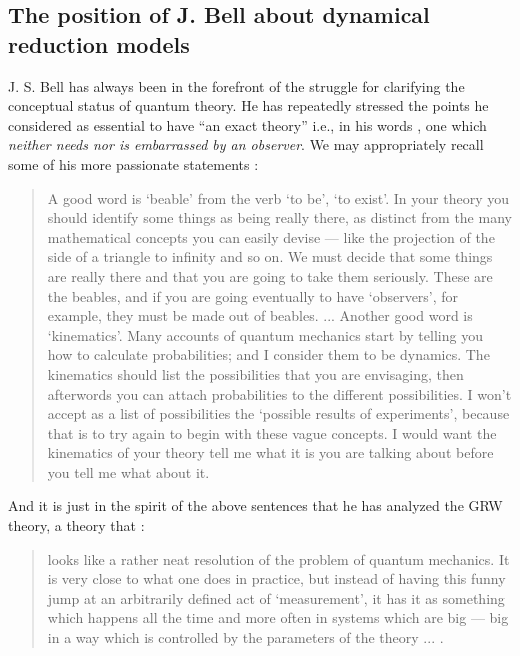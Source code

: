 \documentclass[10pt,a4paper]{article}
\begin{document}
\subsection{The position of J. Bell about dynamical reduction
models} \label{sec121}

J. S. Bell has always been in the forefront of the struggle for
clarifying the conceptual status of quantum theory. He has
repeatedly stressed the points he considered as essential to have
``an exact theory'' i.e., in his words \cite{bellqg}, one which
{\it neither needs nor is embarrassed by an observer}. We may
appropriately recall some of his more passionate statements \cite{bell89}:
\begin{quotation}
A good word is `beable' from the verb `to be', `to exist'. In your
theory you should identify some things as being really there, as
distinct from the many mathematical concepts you can easily devise
--- like the projection of the side of a triangle to infinity and
so on. We must decide that some things are really there and that
you are going to take them seriously. These are the beables, and
if you are going eventually to have `observers', for example, they
must be made out of beables. ... Another good word is
`kinematics'. Many accounts of quantum mechanics start by telling
you how to calculate probabilities; and I consider them to be
dynamics. The kinematics should list the possibilities that you
are envisaging, then afterwords you can attach probabilities to
the different possibilities. I won't accept as a list of
possibilities the `possible results of experiments', because that
is to try again to begin with these vague concepts. I would want
the kinematics of your theory tell me what it is you are talking
about before you tell me what about it.
\end{quotation}
And it is just in the spirit of the above sentences that he has
analyzed the GRW theory, a theory that \cite{bell89}:
\begin{quotation}
looks like a rather neat resolution of the problem of quantum
mechanics. It is very close to what one does in practice, but
instead of having this funny jump at an arbitrarily defined act of
`measurement', it has it as something which happens all the time
and more often in systems which are big --- big in a way which is
controlled by the parameters of the theory ... .
\end{quotation}
\end{document}
